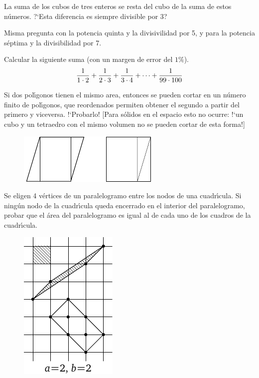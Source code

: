 \documentclass[12pt, spanish]{article}  %
\begin{document}
 La suma de los cubos de tres enteros se resta del cubo de la suma de estos n\'umeros. ?`Esta diferencia es siempre divisible por 3?

\bigskip
{} Misma pregunta con la potencia quinta y la divisivilidad por 5, y para la potencia s\'eptima y la divisibilidad por 7.

\bigskip
{} Calcular la siguiente suma (con un margen de error del $1\%$).
$${1 \over 1\cdot 2} +  {1 \over 2\cdot 3} + {1 \over 3\cdot 4} + \dots + {1 \over 99\cdot 100}$$


\bigskip
{} Si dos pol\'{\i}gonos tienen el mismo area, entonces se pueden cortar en un n\'umero finito de pol\'{\i}gonos, que reordenados permiten obtener el segundo a partir del primero y viceversa. !`Probarlo! [Para s\'olidos en el espacio esto no ocurre: !`un cubo y un tetraedro con el mismo volumen no se pueden cortar de esta forma!]
\begin{figure}[h]
\centering
\includegraphics{q39_horizontal}\\[6pt]
\end{figure}


 Se eligen 4 v\'ertices de un paralelogramo entre los nodos de una cuadr\'{\i}cula. Si ning\'un nodo de la cuadr\'{\i}cula queda encerrado en el interior del paralelogramo, probar que el \'area del paralelogramo es igual al de cada uno de los cuadros de la cuadr\'{\i}cula. 
\begin{figure}[h]
 \centering
\includegraphics{taskbook-24}\vskip3pt
\end{figure}
\end{document}
